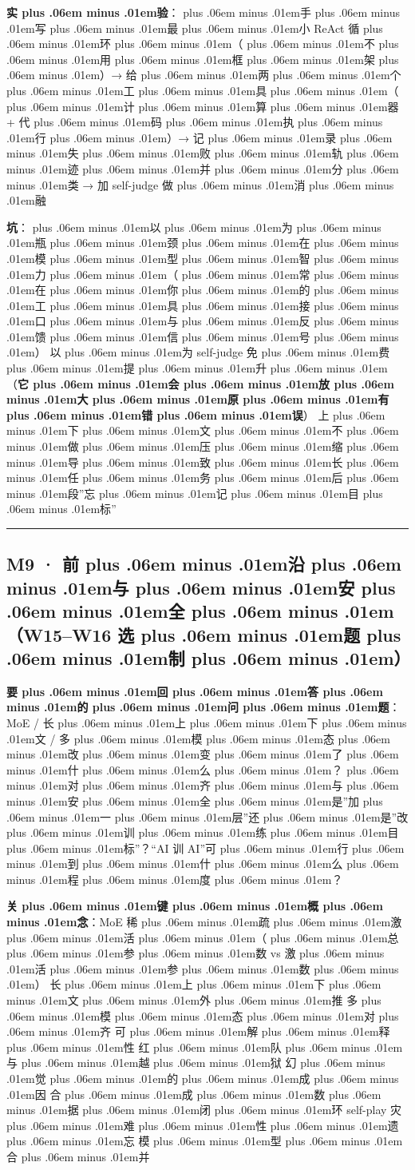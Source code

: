 \documentclass[
]{article}
\def\zh#1{{\zhfont #1}}
\def\sym#1{{\symfont #1}}
\def\zhglue{\hskip0pt plus .06em minus .01em}
\begin{document}
\textbf{\zh{实\zhglue 验}}\zh{：\zhglue 手\zhglue 写\zhglue 最\zhglue 小} ReAct \zh{循\zhglue 环\zhglue （\zhglue 不\zhglue 用\zhglue 框\zhglue 架\zhglue ）}\sym{→} \zh{给\zhglue 两\zhglue 个\zhglue 工\zhglue 具\zhglue （\zhglue 计\zhglue 算\zhglue 器} + \zh{代\zhglue 码\zhglue 执\zhglue 行\zhglue ）}\sym{→} \zh{记\zhglue 录\zhglue 失\zhglue 败\zhglue 轨\zhglue 迹\zhglue 并\zhglue 分\zhglue 类} \sym{→} \zh{加} self-judge \zh{做\zhglue 消\zhglue 融}

\textbf{\zh{坑}}\zh{：\zhglue 以\zhglue 为\zhglue 瓶\zhglue 颈\zhglue 在\zhglue 模\zhglue 型\zhglue 智\zhglue 力\zhglue （\zhglue 常\zhglue 在\zhglue 你\zhglue 的\zhglue 工\zhglue 具\zhglue 接\zhglue 口\zhglue 与\zhglue 反\zhglue 馈\zhglue 信\zhglue 号\zhglue ）}\textbar{} \zh{以\zhglue 为} self-judge \zh{免\zhglue 费\zhglue 提\zhglue 升\zhglue （}\textbf{\zh{它\zhglue 会\zhglue 放\zhglue 大\zhglue 原\zhglue 有\zhglue 错\zhglue 误}}\zh{）}\textbar{} \zh{上\zhglue 下\zhglue 文\zhglue 不\zhglue 做\zhglue 压\zhglue 缩\zhglue 导\zhglue 致\zhglue 长\zhglue 任\zhglue 务\zhglue 后\zhglue 段}''\zh{忘\zhglue 记\zhglue 目\zhglue 标}''

\begin{center}\rule{0.5\linewidth}{0.5pt}\end{center}

\subsection{M9 \sym{·} \zh{前\zhglue 沿\zhglue 与\zhglue 安\zhglue 全\zhglue （}W15--W16 \zh{选\zhglue 题\zhglue 制\zhglue ）}}\label{m9-ux524dux6cbfux4e0eux5b89ux5168w15w16-ux9009ux9898ux5236}

\textbf{\zh{要\zhglue 回\zhglue 答\zhglue 的\zhglue 问\zhglue 题}}\zh{：}MoE / \zh{长\zhglue 上\zhglue 下\zhglue 文} / \zh{多\zhglue 模\zhglue 态\zhglue 改\zhglue 变\zhglue 了\zhglue 什\zhglue 么\zhglue ？\zhglue 对\zhglue 齐\zhglue 与\zhglue 安\zhglue 全\zhglue 是}''\zh{加\zhglue 一\zhglue 层}''\zh{还\zhglue 是}''\zh{改\zhglue 训\zhglue 练\zhglue 目\zhglue 标}''\zh{？}``AI \zh{训} AI''\zh{可\zhglue 行\zhglue 到\zhglue 什\zhglue 么\zhglue 程\zhglue 度\zhglue ？}

\textbf{\zh{关\zhglue 键\zhglue 概\zhglue 念}}\zh{：}MoE \zh{稀\zhglue 疏\zhglue 激\zhglue 活\zhglue （\zhglue 总\zhglue 参\zhglue 数} vs \zh{激\zhglue 活\zhglue 参\zhglue 数\zhglue ）}\textbar{} \zh{长\zhglue 上\zhglue 下\zhglue 文\zhglue 外\zhglue 推} \textbar{} \zh{多\zhglue 模\zhglue 态\zhglue 对\zhglue 齐} \textbar{} \zh{可\zhglue 解\zhglue 释\zhglue 性} \textbar{} \zh{红\zhglue 队\zhglue 与\zhglue 越\zhglue 狱} \textbar{} \zh{幻\zhglue 觉\zhglue 的\zhglue 成\zhglue 因} \textbar{} \zh{合\zhglue 成\zhglue 数\zhglue 据\zhglue 闭\zhglue 环} \textbar{} self-play \textbar{} \zh{灾\zhglue 难\zhglue 性\zhglue 遗\zhglue 忘} \textbar{} \zh{模\zhglue 型\zhglue 合\zhglue 并}
\end{document}
